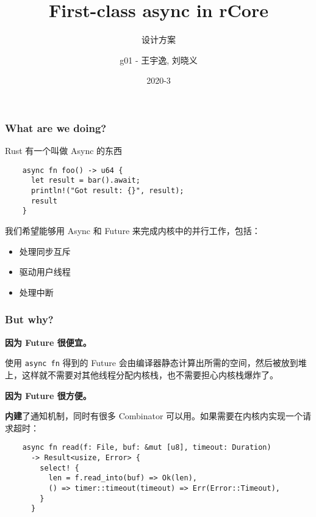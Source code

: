 \documentclass[UTF-8]{ctexbeamer}
\title{First-class async in rCore}
\subtitle{设计方案}
\author{g01 - 王宇逸, 刘晓义}
\date{2020-3}
\begin{document}
\begin{frame}
  \titlepage
\end{frame}

\begin{frame}[fragile]
  \frametitle{What are we doing?}

  Rust 有一个叫做 Async 的东西

  \begin{verbatim}
    async fn foo() -> u64 {
      let result = bar().await;
      println!("Got result: {}", result);
      result
    }
  \end{verbatim}

  \vspace{1em}

  我们希望能够用 Async 和 Future 来完成内核中的并行工作，包括：
  \begin{itemize}
    \item 处理同步互斥
    \item 驱动用户线程
    \item 处理中断
  \end{itemize}
\end{frame}

\begin{frame}[fragile]
  \frametitle{But why?}

  \textbf{因为 Future 很便宜。}
  
  使用 \texttt{async fn} 得到的 Future 会由编译器静态计算出所需的空间，然后被放到堆上，这样就不需要对其他线程分配内核栈，也不需要担心内核栈爆炸了。

  \vspace{1em}

  \textbf{因为 Future 很方便。}

  \textbf{内建}了通知机制，同时有很多 Combinator 可以用。如果需要在内核内实现一个请求超时：

  {
    \scriptsize
  \begin{verbatim}
    async fn read(f: File, buf: &mut [u8], timeout: Duration)
      -> Result<usize, Error> {
        select! {
          len = f.read_into(buf) => Ok(len),
          () => timer::timeout(timeout) => Err(Error::Timeout),
        }
      }
  \end{verbatim}
  }
\end{frame}
\end{document}
